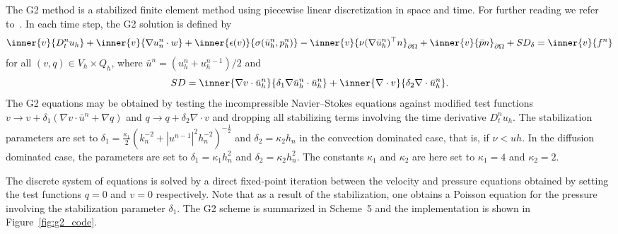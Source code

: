 The G2 method is a stabilized finite element method using piecewise
linear discretization in space and time. For further reading we refer
to~\cite{JohnsonHoffman2007}.  In each time step, the G2 solution is
defined by
\begin{equation*}
  \begin{split}
    \inner{v}{D_t^n u_h}
    + \inner{v}{\nabla u_n^n \cdot w}
    + \inner{\epsilon(v)}{\sigma(\bar{u}_h^n, p_h^n)}
    - \inner{v}{\nu (\nabla \bar{u}_h^n)^{\top} n}_{\partial\Omega}
    + \inner{v}{\bar{p} n}_{\partial\Omega}
    + SD_{\delta}
    = \inner{v}{f^n}
  \end{split}
\end{equation*}
for all $(v, q) \in V_h \times Q_h$, where $\bar{u}^{n} =
({u}^{n}_h + {u}^{n-1}_h) / 2$ and
\begin{equation*}
  SD
  = \inner{\nabla v \cdot \bar{u}_h^n}{\delta_1 \nabla \bar{u}_h^n \cdot \bar{u}_h^n}
  + \inner{\nabla \cdot v}{\delta_2 \nabla \cdot \bar{u}_h^n}.
\end{equation*}
The G2 equations may be obtained by testing the incompressible
Navier--Stokes equations against modified test functions $v
\rightarrow v + \delta_1 (\nabla v \cdot \bar{u}^{n} + \nabla q)$ and
$q \rightarrow q + \delta_2 \nabla \cdot v$ and dropping all
stabilizing terms involving the time derivative $D_t^n u_h$. The
stabilization parameters are set to $\delta_{1}
= \frac{\kappa_1}{2}(k_{n}^{-2} +
|u^{n-1}|^{2}h_{n}^{-2})^{-\frac{1}{2}}$ and $\delta_{2}= \kappa_2
h_n$ in the convection dominated case, that is, if $\nu < uh$. In the
diffusion dominated case, the parameters are set to $\delta_{1}
= \kappa_1 h_{n}^2$ and $\delta_{2} = \kappa_2 h_{n}^2$. The
constants $\kappa_1$ and $\kappa_2$ are here set to $\kappa_1 = 4$ and
$\kappa_2 = 2$.

The discrete system of equations is solved by a direct fixed-point
iteration between the velocity and pressure equations obtained by
setting the test functions $q = 0$ and $v = 0$ respectively. Note that
as a result of the stabilization, one obtains a Poisson equation for
the pressure involving the stabilization parameter $\delta_1$. The G2
scheme is summarized in Scheme~5 and the implementation is shown in
Figure~\ref{fig:g2_code}.

